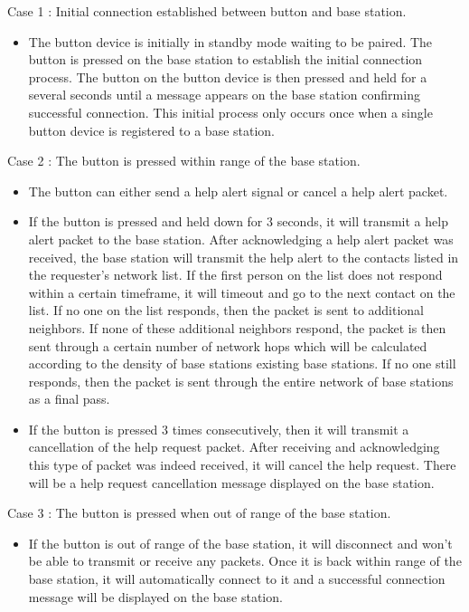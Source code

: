 \documentclass[journal]{IEEEtran}
\begin{document}
\begin{LaTeXdescription}
\item[Case 1]:  Initial connection established between button and base station.
  \begin{itemize}
    \item The button device is initially in standby mode waiting to be paired.  The button is pressed on the base station to establish the initial connection process.  The button on the button device is then pressed and held for a several seconds until a message appears on the base station confirming successful connection.  This initial process only occurs once when a single button device is registered to a base station.
  \end{itemize}
\item[Case 2]:  The button is pressed within range of the base station.
  \begin{itemize}
    \item The button can either send a help alert signal or cancel a help alert packet.
    \item If the button is pressed and held down for 3 seconds, it will transmit a help alert packet to the base station.  After acknowledging a help alert packet was received, the base station will transmit the help alert to the contacts listed in the requester’s network list.  If the first person on the list does not respond within a certain timeframe, it will timeout and go to the next contact on the list.  If no one on the list responds, then the packet is sent to additional neighbors.  If none of these additional neighbors respond, the packet is then sent through a certain number of network hops which will be calculated according to the density of base stations existing base stations.  If no one still responds, then the packet is sent through the entire network of base stations as a final pass.
    \item If the button is pressed 3 times consecutively, then it will transmit a cancellation of the help request packet.  After receiving and acknowledging this type of packet was indeed received, it will cancel the help request.  There will be a help request cancellation message displayed on the base station.
  \end{itemize}
\item[Case 3]:  The button is pressed when out of range of the base station.
  \begin{itemize}
    \item If the button is out of range of the base station, it will disconnect and won’t be able to transmit or receive any packets.  Once it is back within range of the base station, it will automatically connect to it and a successful connection message will be displayed on the base station.

\end{itemize}
\end{LaTeXdescription}
\end{document}
